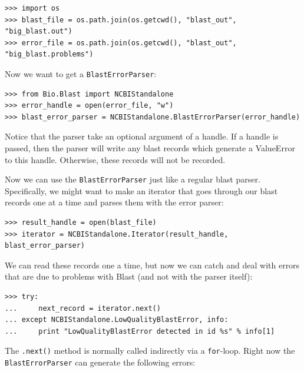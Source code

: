 \documentclass{report}
\begin{document}
\begin{verbatim}
>>> import os
>>> blast_file = os.path.join(os.getcwd(), "blast_out", "big_blast.out")
>>> error_file = os.path.join(os.getcwd(), "blast_out", "big_blast.problems")
\end{verbatim}

Now we want to get a \verb|BlastErrorParser|:

\begin{verbatim}
>>> from Bio.Blast import NCBIStandalone
>>> error_handle = open(error_file, "w")
>>> blast_error_parser = NCBIStandalone.BlastErrorParser(error_handle)
\end{verbatim}

Notice that the parser take an optional argument of a handle. If a handle is passed, then the parser will write any blast records which generate a ValueError to this handle. Otherwise, these records will not be recorded.

Now we can use the \verb|BlastErrorParser| just like a regular blast parser. Specifically, we might want to make an iterator that goes through our blast records one at a time and parses them with the error parser:

\begin{verbatim}
>>> result_handle = open(blast_file)
>>> iterator = NCBIStandalone.Iterator(result_handle, blast_error_parser)
\end{verbatim}

We can read these records one a time, but now we can catch and deal with errors that are due to problems with Blast (and not with the parser itself):

\begin{verbatim}
>>> try:
...     next_record = iterator.next()
... except NCBIStandalone.LowQualityBlastError, info:
...     print "LowQualityBlastError detected in id %s" % info[1]
\end{verbatim}

The \verb|.next()| method is normally called indirectly via a \verb|for|-loop.
Right now the \verb|BlastErrorParser| can generate the following errors:
\end{document}
